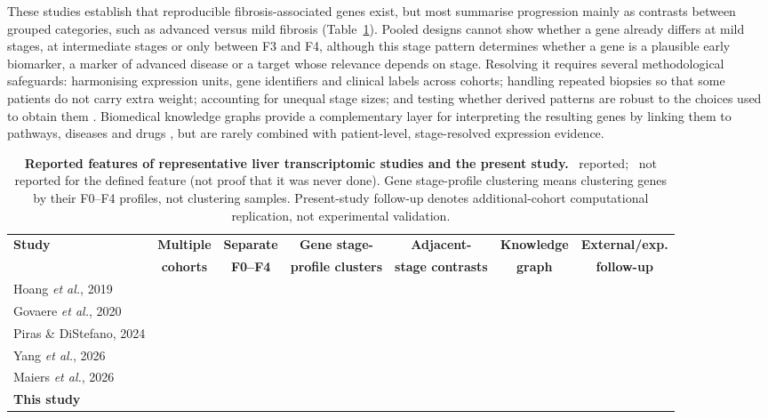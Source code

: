 \documentclass[11pt,a4paper]{article}
\newcommand{\Y}{\textcolor{yes}{\ding{51}}}\newcommand{\N}{\textcolor{no}{\ding{55}}}
\begin{document}
These studies establish that reproducible fibrosis-associated genes exist, but most summarise progression mainly as contrasts between grouped categories, such as advanced versus mild fibrosis (Table~\ref{tab:compare}). Pooled designs cannot show whether a gene already differs at mild stages, at intermediate stages or only between F3 and F4, although this stage pattern determines whether a gene is a plausible early biomarker, a marker of advanced disease or a target whose relevance depends on stage. Resolving it requires several methodological safeguards: harmonising expression units, gene identifiers and clinical labels across cohorts; handling repeated biopsies so that some patients do not carry extra weight; accounting for unequal stage sizes; and testing whether derived patterns are robust to the choices used to obtain them \cite{ramasamy2008,sweeney2017,leek2010}. Biomedical knowledge graphs provide a complementary layer for interpreting the resulting genes by linking them to pathways, diseases and drugs \cite{nicholson2020,himmelstein2017,chandak2023,optimuskg}, but are rarely combined with patient-level, stage-resolved expression evidence.

\begin{table}[!t]\centering
\caption{\textbf{Reported features of representative liver transcriptomic studies and the present study.} \Y\ reported; \N\ not reported for the defined feature (not proof that it was never done). Gene stage-profile clustering means clustering genes by their F0--F4 profiles, not clustering samples. Present-study follow-up denotes additional-cohort computational replication, not experimental validation.}\label{tab:compare}
\footnotesize\setlength{\tabcolsep}{3.5pt}\renewcommand{\arraystretch}{1.2}
\begin{tabular}{lcccccc}
\toprule
\rowcolor{white}\textbf{Study} & \textbf{Multiple} & \textbf{Separate} & \textbf{Gene stage-} & \textbf{Adjacent-} & \textbf{Knowledge} & \textbf{External/exp.} \\
\rowcolor{white} & \textbf{cohorts} & \textbf{F0--F4} & \textbf{profile clusters} & \textbf{stage contrasts} & \textbf{graph} & \textbf{follow-up} \\
\midrule
Hoang \textit{et al.}, 2019 \cite{hoang2019} & \N & \Y & \N & \N & \N & \N \\
Govaere \textit{et al.}, 2020 \cite{govaere2020} & \Y & \Y & \N & \N & \N & \Y \\
Piras \& DiStefano, 2024 \cite{piras2024} & \Y & \N & \N & \N & \N & \Y \\
Yang \textit{et al.}, 2026 \cite{yang2026} & \Y & \N & \N & \N & \N & \Y \\
Maiers \textit{et al.}, 2026 \cite{maiers2026} & \Y & \N & \N & \N & \N & \Y \\
\textbf{This study} & \Y & \Y & \Y & \Y & \Y & \Y \\
\bottomrule
\end{tabular}
\end{table}
\end{document}
